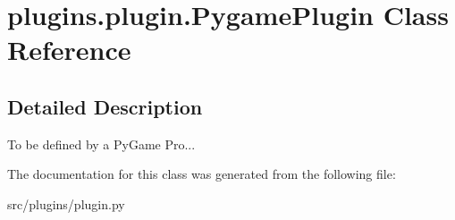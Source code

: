 \hypertarget{classplugins_1_1plugin_1_1_pygame_plugin}{\section{plugins.\-plugin.\-Pygame\-Plugin \-Class \-Reference}
\label{classplugins_1_1plugin_1_1_pygame_plugin}
}


\subsection{\-Detailed \-Description}
\begin{DoxyVerb}To be defined by a PyGame Pro... \end{DoxyVerb}
 

\-The documentation for this class was generated from the following file\-:\begin{DoxyCompactItemize}
\item 
src/plugins/plugin.\-py\end{DoxyCompactItemize}
